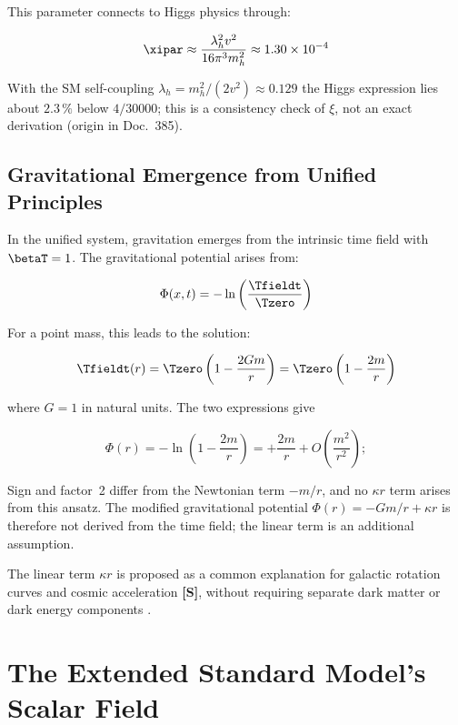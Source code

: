 	This parameter connects to Higgs physics through:
	
	\begin{equation}
		\xipar \approx \frac{\lambda_h^2 v^2}{16\pi^3 m_h^2} \approx 1.30 \times 10^{-4}
	\end{equation}
	
	With the SM self-coupling $\lambda_h = m_h^2/(2v^2) \approx 0.129$ the Higgs expression lies about $2.3\,\%$ below $4/30000$; this is a consistency check of $\xi$, not an exact derivation (origin in Doc.~385).
	
	\subsection{Gravitational Emergence from Unified Principles}
	\label{subsec:gravitational_emergence_unified}
	
	In the unified system, gravitation emerges from the intrinsic time field with $\betaT = 1$. The gravitational potential arises from:
	
	\begin{equation}
		\Phi(x,t) = -\ln\left(\frac{\Tfieldt}{\Tzero}\right)
	\end{equation}
	
	For a point mass, this leads to the solution:
	
	\begin{equation}
		\Tfieldt(r) = \Tzero\left(1 - \frac{2Gm}{r}\right) = \Tzero\left(1 - \frac{2m}{r}\right)
	\end{equation}
	
	where $G = 1$ in natural units. The two expressions give
	
	\begin{equation}
		\Phi(r) = -\ln\left(1 - \frac{2m}{r}\right) = +\frac{2m}{r} + O\!\left(\frac{m^2}{r^2}\right);
	\end{equation}
	
	Sign and factor~2 differ from the Newtonian term $-m/r$, and no $\kappa r$ term arises from this ansatz. The modified gravitational potential $\Phi(r) = -Gm/r + \kappa r$ is therefore not derived from the time field; the linear term is an additional assumption.
	
	The linear term $\kappa r$ is proposed as a common explanation for galactic rotation curves and cosmic acceleration \textbf{[S]}, without requiring separate dark matter or dark energy components \cite{McGaugh2016}.
	
	\section{The Extended Standard Model's Scalar Field}
	\label{sec:esm_scalar_field}
	
